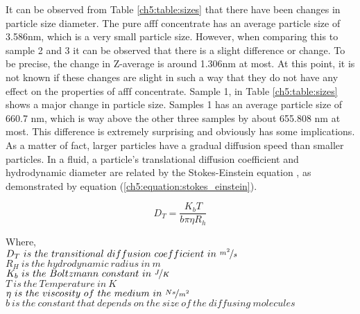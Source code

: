 It can be observed from Table \ref{ch5:table:sizes} that there have been changes in particle size diameter. The pure \acrshort{afff} concentrate has an average particle size of 3.586nm, which is a very small particle size. However, when comparing this to sample 2 and 3 it can be observed that there is a slight difference or change. To be precise, the change in Z-average is around 1.306nm at most. At this point, it is not known if these changes are slight in such a way that they do not have any effect on the properties of \acrshort{afff} concentrate. Sample 1, in Table \ref{ch5:table:sizes} shows a major change in particle size. Samples 1 has an average particle size of 660.7 nm, which is way above the other three samples by about 655.808 nm at most. This difference is extremely surprising and obviously has some implications. As a matter of fact, larger particles have a gradual diffusion speed than smaller particles. In a fluid, a particle's translational diffusion coefficient and hydrodynamic diameter are related by the Stokes-Einstein equation \cite{lin1991handbook}, as demonstrated by equation (\ref{ch5:equation:stokes_einstein}).

\begin{equation}
    D_T=\frac{K_bT}{b\pi \eta R_h}
    \label{ch5:equation:stokes_einstein}
\end{equation}

\begin{doublespace}
Where, \\
$D_T\ is\ the\ transitional\ diffusion\ coefficient\ in\ \nicefrac{m^2}{s}$ \\
$R_H\ is\ the\ hydrodynamic\ radius\ in\ m$ \\
$K_b\ is\ the\ Boltzmann\ constant\ in\ \nicefrac{J}{K}$ \\
$T\ is\ the\ Temperature\ in\ K$ \\
$\eta\ is\ the\ viscosity\ of\ the\ medium\ in\ \nicefrac{Ns}{m^2}$ \\
$b\ is\ the\ constant\ that\ depends\ on\ the\ size\ of\ the\ diffusing\ molecules$ \\
\end{doublespace}


